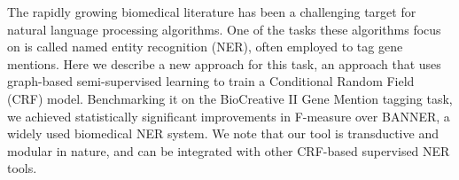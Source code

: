 The rapidly growing biomedical literature has been a challenging target for natural language processing algorithms. One of the tasks these algorithms focus on is called named entity recognition (NER), often employed to tag gene mentions. Here we describe a new approach for this task, an approach that uses graph-based semi-supervised learning to train a Conditional Random Field (CRF) model. Benchmarking it on the BioCreative II Gene Mention tagging task, we achieved statistically significant improvements in F-measure over BANNER, a widely used biomedical NER system. We note that our tool is transductive and modular in nature, and can be integrated with other CRF-based supervised NER tools.

